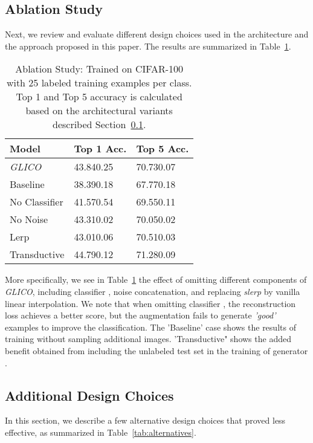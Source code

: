 \documentclass[a4paper,conference]{IEEEtran}
\begin{document}
\subsection{Ablation Study}
\label{sec: ablation}

Next, we review and evaluate different design choices used in the architecture and the approach proposed in this paper. The results are summarized in Table~\ref{tab:ablation-study}.

\begin{table}[htbp]
	\centering
	\caption{Ablation Study: Trained on CIFAR-100 with 25 labeled training examples per class. Top 1 and Top 5 accuracy is calculated based on the architectural variants described Section~\ref{sec: ablation}. 	\label{tab:ablation-study}}
	\begin{tabular}{l|ll}
		Model          & Top 1 Acc.     & Top 5 Acc.     \\
		\toprule
		\textit{GLICO} & 43.840.25 & 70.730.07 \\
		Baseline       & 38.390.18 & 67.770.18 \\
		No Classifier  & 41.570.54 & 69.550.11 \\
		No Noise      & 43.310.02 & 70.050.02 \\
		Lerp           & 43.010.06 & 70.510.03 \\
		Transductive   & 44.790.12 & 71.280.09 \\
		\bottomrule
	\end{tabular}
\end{table}


More specifically, we see in Table~\ref{tab:ablation-study} the effect of omitting different components of \textit{GLICO}, including classifier , noise concatenation, and replacing \emph{slerp} by vanilla linear interpolation. We note that when omitting classifier , the reconstruction loss achieves a better score, but the augmentation fails to generate \textit{'good'} examples to improve the classification. The 'Baseline' case shows the results of training without sampling additional images. 'Transductive" shows the added benefit obtained from including the unlabeled test set in the training of generator . 

		
\subsection{Additional Design Choices}

In this section, we describe a few alternative design choices that proved less effective, as summarized in Table~\ref{tab:alternatives}.
\end{document}
